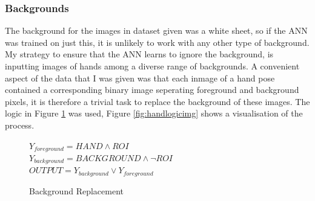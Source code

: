        \subsubsection{Backgrounds}
        The background for the images in dataset given was a white sheet, so if the ANN was trained on just this, it is unlikely to work with any other type of background. My strategy to ensure that the ANN learns to ignore the background, is inputting images of hands among a diverse range of backgrounds. A convenient aspect of the data that I was given was that each inmage of a hand pose contained a corresponding binary image seperating foreground and background pixels, it is therefore a trivial task to replace the background of these images. The logic in Figure \ref{fig:handlogic} was used, Figure \ref{fig:handlogicimg} shows a visualisation of the process.
        
        \begin{figure}
            \centering
        $Y_{foreground} = HAND \land ROI$ \\
        $Y_{background} = BACKGROUND \land \lnot ROI$\\
        $OUTPUT = Y_{background} \lor Y_{foreground}$
        \caption{Background Replacement}
        \label{fig:handlogic}
    \end{figure}

